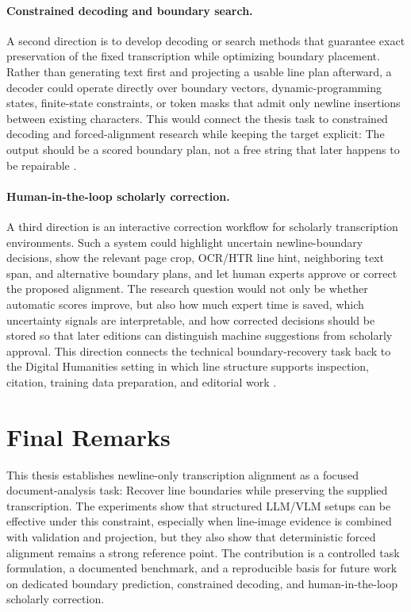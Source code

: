 \paragraph{Constrained decoding and boundary search.}
A second direction is to develop decoding or search methods that guarantee exact preservation of the fixed transcription while optimizing boundary placement. Rather than generating text first and projecting a usable line plan afterward, a decoder could operate directly over boundary vectors, dynamic-programming states, finite-state constraints, or token masks that admit only newline insertions between existing characters. This would connect the thesis task to constrained decoding and forced-alignment research while keeping the target explicit: The output should be a scored boundary plan, not a free string that later happens to be repairable .

\paragraph{Human-in-the-loop scholarly correction.}
A third direction is an interactive correction workflow for scholarly transcription environments. Such a system could highlight uncertain newline-boundary decisions, show the relevant page crop, OCR/HTR line hint, neighboring text span, and alternative boundary plans, and let human experts approve or correct the proposed alignment. The research question would not only be whether automatic scores improve, but also how much expert time is saved, which uncertainty signals are interpretable, and how corrected decisions should be stored so that later editions can distinguish machine suggestions from scholarly approval. This direction connects the technical boundary-recovery task back to the Digital Humanities setting in which line structure supports inspection, citation, training data preparation, and editorial work .

\section{Final Remarks}
\label{sec:conclusion_final_remarks}

This thesis establishes newline-only transcription alignment as a focused document-analysis task: Recover line boundaries while preserving the supplied transcription. The experiments show that structured LLM/VLM setups can be effective under this constraint, especially when line-image evidence is combined with validation and projection, but they also show that deterministic forced alignment remains a strong reference point. The contribution is a controlled task formulation, a documented benchmark, and a reproducible basis for future work on dedicated boundary prediction, constrained decoding, and human-in-the-loop scholarly correction.
